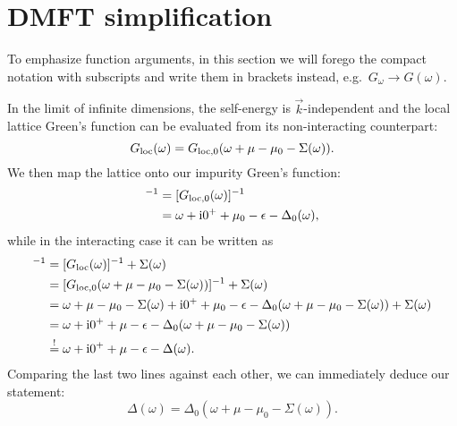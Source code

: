 \section{DMFT simplification}
\label{app:dmft-simplification}

To emphasize function arguments,
in this section
we will forego the compact notation with subscripts and write them in brackets instead,
e.g.\ $G_\omega \to G(\omega)$.

In the limit of infinite dimensions, the self-energy is $\vec{k}$-independent
and the local lattice Green's function can be evaluated from
its non-interacting counterpart:
\begin{equation}
    G_{\mathrm{loc}}(\omega)
    =
    G_{\mathrm{loc},0}(\omega + \mu - \mu_0 - \Sigma(\omega)).
\end{equation}
We then map the lattice onto our impurity Green's function:
\begin{align}
    [G_0(\omega)]^{-1}
     & =
    [G_{\mloc,0}(\omega)]^{-1} \\
     & =
    \omega + \mi0^+ + \mu_0 - \epsilon - \Delta_0(\omega),
    \label{eq:impurity-gf-non-interacting}
\end{align}
while in the interacting case it can be written as
\begin{align}
    [G_0(\omega)]^{-1}
     & =
    [G_{\mloc}(\omega)]^{-1} + \Sigma(\omega)                                                                                             \\
     & =
    [G_{\mloc,0}(\omega + \mu - \mu_0 - \Sigma(\omega))]^{-1} + \Sigma(\omega)                                                            \\
     & =
    \omega + \mu - \mu_0  - \Sigma(\omega) + \mi0^+ + \mu_0 - \epsilon - \Delta_0(\omega + \mu - \mu_0 - \Sigma(\omega)) + \Sigma(\omega) \\
     & =
    \omega + \mi0^+ + \mu - \epsilon - \Delta_0(\omega + \mu - \mu_0 - \Sigma(\omega))                                                    \\
     & \stackrel{!}{=}
    \omega + \mi0^+ + \mu - \epsilon - \Delta(\omega).
\end{align}
Comparing the last two lines against each other,
we can immediately deduce our statement:
\begin{equation}
    \Delta(\omega) = \Delta_0(\omega + \mu - \mu_0 - \Sigma(\omega)).
\end{equation}
